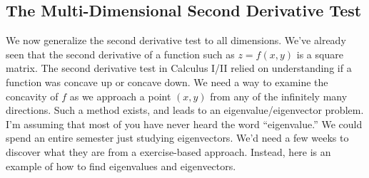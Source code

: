 \documentclass[10pt,]{book}
\theoremstyle{plain}
\theoremstyle{definition}
\theoremstyle{definition}
\theoremstyle{definition}
\theoremstyle{definition}
\theoremstyle{definition}
\numberwithin{equation}{section}
\begin{document}
\subsection[{The Multi-Dimensional Second Derivative Test}]{The Multi-Dimensional Second Derivative Test}\label{subsection-59}
We now generalize the second derivative test to all dimensions. We've already seen that the second derivative of a function such as \(z=f(x,y)\) is a square matrix. The second derivative test in Calculus I/II relied on understanding if a function was concave up or concave down. We need a way to examine the concavity of \(f\) as we approach a point \((x,y)\) from any of the infinitely many directions. Such a method exists, and leads to an eigenvalue/eigenvector problem. I'm assuming that most of you have never heard the word ``eigenvalue.'' We could spend an entire semester just studying eigenvectors. We'd need a few weeks to discover what they are from a exercise-based approach. Instead, here is an example of how to find eigenvalues and eigenvectors.%
\end{document}
